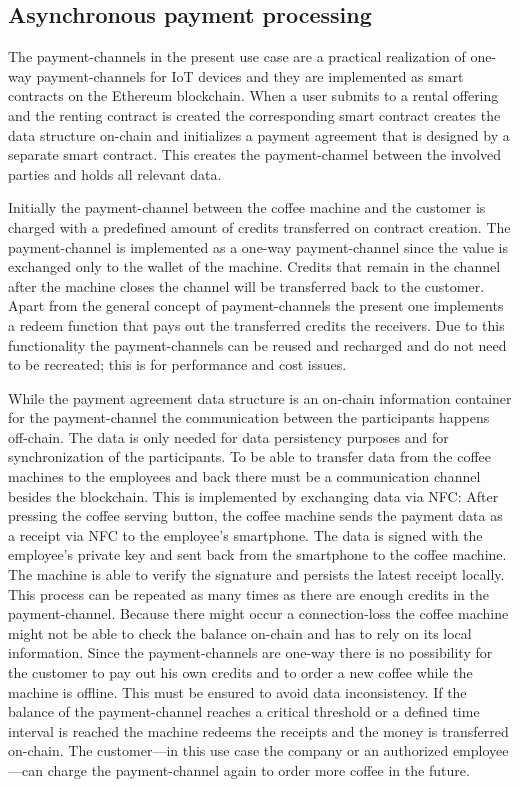 \documentclass[conference]{IEEEtran}
\begin{document}
%
\subsection{Asynchronous payment processing}

The payment-channels in the present use case are a practical realization of one-way payment-channels for IoT devices and they are implemented as smart contracts on the Ethereum blockchain. When a user submits to a rental offering and the renting contract is created the corresponding smart contract creates the data structure on-chain and initializes a payment agreement that is designed by a separate smart contract. This creates the payment-channel between the involved parties and holds all relevant data.

Initially the payment-channel between the coffee machine and the customer is charged with a predefined amount of credits transferred on contract creation. The payment-channel is implemented as a one-way payment-channel since the value is exchanged only to the wallet of the machine. Credits that remain in the channel after the machine closes the channel will be transferred back to the customer. Apart from the general concept of payment-channels the present one implements a redeem function that pays out the transferred credits the receivers. Due to this functionality the payment-channels can be reused and recharged and do not need to be recreated; this is for performance and cost issues.

While the payment agreement data structure is an on-chain information container for the payment-channel the communication between the participants happens off-chain. The data is only needed for data persistency purposes and for synchronization of the participants. To be able to transfer data from the coffee machines to the employees and back there must be a communication channel besides the blockchain. This is implemented by exchanging data via NFC: After pressing the coffee serving button, the coffee machine sends the payment data as a receipt via NFC to the employee's smartphone. The data is signed with the employee's private key and sent back from the smartphone to the coffee machine. The machine is able to verify the signature and persists the latest receipt locally. This process can be repeated as many times as there are enough credits in the payment-channel. Because there might occur a connection-loss the coffee machine might not be able to check the balance on-chain and has to rely on its local information. Since the payment-channels are one-way there is no possibility for the customer to pay out his own credits and to order a new coffee while the machine is offline. This must be ensured to avoid data inconsistency. If the balance of the payment-channel reaches a critical threshold or a defined time interval is reached the machine redeems the receipts and the money is transferred on-chain. The customer---in this use case the company or an authorized employee---can charge the payment-channel again to order more coffee in the future.
\end{document}
